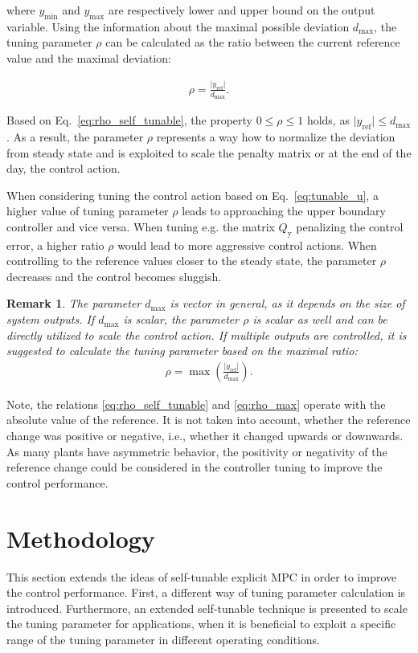 \documentclass[preprint,12pt]{elsarticle}
\newtheorem{remark}[theorem]{Remark}
\begin{document}
where $y_{\min}$ and $y_{\max}$ are respectively lower and upper bound on the output variable. Using the information about the maximal possible deviation $d_{\max}$, the tuning parameter $\rho$ can be calculated as the ratio between the current reference value and the maximal deviation:  

\begin{eqnarray}
	\label{eq:rho_self_tunable}
	\rho = \frac{\vert y_{\mathrm{ref}} \vert}{d_{\max}}.
\end{eqnarray}

Based on Eq.~\eqref{eq:rho_self_tunable}, the property $0 \le \rho \le 1$ holds, as $\vert y_{\mathrm{ref}} \vert \le d_{\max}$. As a result, the parameter $\rho$ represents a way how to normalize the deviation from steady state and is exploited to scale the penalty matrix or at the end of the day, the control action. 

When considering tuning the control action based on Eq.~\eqref{eq:tunable_u}, a higher value of tuning parameter $\rho$ leads to approaching the upper boundary controller and vice versa. When tuning e.g. the matrix $Q_\mathrm{y}$ penalizing the control error, a higher ratio $\rho$ would lead to more aggressive control actions. When controlling to the reference values closer to the steady state, the parameter $\rho$ decreases and the control becomes sluggish.

\begin{remark}
	The parameter $d_{\max}$ is vector in general, as it depends on the size of system outputs. If $d_{\max}$ is scalar, the parameter $\rho$ is scalar as well and can be directly utilized to scale the control action. If multiple outputs are controlled, it is suggested to calculate the tuning parameter based on the maximal ratio:
	\begin{eqnarray}
		\label{eq:rho_max}
		\rho = \max \left( \frac{\vert y_{\mathrm{ref}} \vert}{d_{\max}} \right).
	\end{eqnarray}	
\end{remark}

Note, the relations \eqref{eq:rho_self_tunable} and \eqref{eq:rho_max} operate with the absolute value of the reference. It is not taken into account, whether the reference change was positive or negative, i.e., whether it changed upwards or downwards. As many plants have asymmetric behavior, the positivity or negativity of the reference change could be considered in the controller tuning to improve the control performance.
    

\section{Methodology}
\label{sec:methodology}
This section extends the ideas of self-tunable explicit MPC in order to improve the control performance. First, a different way of tuning parameter calculation is introduced. Furthermore, an extended self-tunable technique is presented to scale the tuning parameter for applications, when it is beneficial to exploit a specific range of the tuning parameter in different operating conditions. 
\end{document}
